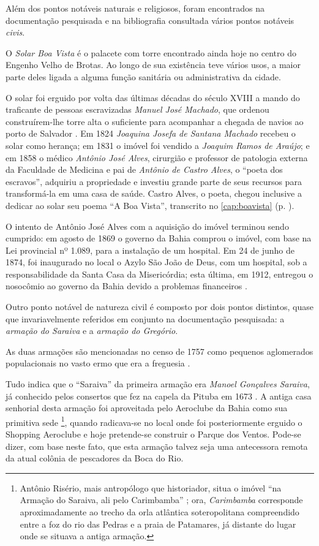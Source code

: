 Além dos pontos notáveis naturais e religiosos, foram encontrados na documentação pesquisada e na bibliografia consultada vários pontos notáveis \textit{civis}.

O \textit{Solar Boa Vista} é o palacete com torre encontrado ainda hoje no centro do Engenho Velho de Brotas. Ao longo de sua existência teve vários usos, a maior parte deles ligada a alguma função sanitária ou administrativa da cidade.

O solar foi erguido por volta das últimas décadas do século XVIII a mando do traficante de pessoas escravizadas \textit{Manuel José Machado}, que ordenou construírem-lhe torre alta o suficiente para acompanhar a chegada de navios ao porto de Salvador \cite[p.~127]{mattos_panorama_2011}. Em 1824 \textit{Joaquina Josefa de Santana Machado} recebeu o solar como herança; em 1831 o imóvel foi vendido a \textit{Joaquim Ramos de Araújo}; e em 1858 o médico \textit{Antônio José Alves}, cirurgião e professor de patologia externa da Faculdade de Medicina e pai de \textit{Antônio de Castro Alves}, o ``poeta dos escravos'', adquiriu a propriedade e investiu grande parte de seus recursos para transformá-la em uma casa de saúde. Castro Alves, o poeta, chegou inclusive a dedicar ao solar seu poema ``A Boa Vista'', transcrito no \autoref{cap:boavista} (p. \pageref{cap:boavista}).

O intento de Antônio José Alves com a aquisição do imóvel terminou sendo cumprido: em agosto de 1869 o governo da Bahia comprou o imóvel, com base na Lei provincial nº 1.089, para a instalação de um hospital. Em 24 de junho de 1874, foi inaugurado no local o Azylo São João de Deus, com um hospital, sob a responsabilidade da Santa Casa da Misericórdia; esta última, em 1912, entregou o nosocômio ao governo da Bahia devido a problemas financeiros \cite{jacobina_asylo_2001}.

Outro ponto notável de natureza civil é composto por dois pontos distintos, quase que invariavelmente referidos em conjunto na documentação pesquisada: a \textit{armação do Saraiva} e a \textit{armação do Gregório}.

As duas armações são mencionadas no censo de 1757 como pequenos aglomerados populacionais no vasto ermo que era a freguesia \cite[p.~183]{castralmeida_ultramar_1908}.

Tudo indica que o ``Saraiva'' da primeira armação era \textit{Manoel Gonçalves Saraiva}, já conhecido pelos consertos que fez na capela da Pituba em 1673 \cite[p.~11]{ott_engenhos_1996}. A antiga casa senhorial desta armação foi aproveitada pelo Aeroclube da Bahia como sua primitiva sede \cite[p.~III-11, verso]{teixeira_doacoes_1978}\footnote{Antônio Risério, mais antropólogo que historiador, situa o imóvel ``na Armação do Saraiva, ali pelo Carimbamba'' \cite{riserio_histba_2004}; ora, \textit{Carimbamba} corresponde aproximadamente ao trecho da orla atlântica soteropolitana compreendido entre a foz do rio das Pedras e a praia de Patamares, já distante do lugar onde se situava a antiga armação.}, quando radicava-se no local onde foi posteriormente erguido o Shopping Aeroclube e hoje pretende-se construir o Parque dos Ventos. Pode-se dizer, com base neste fato, que esta armação talvez seja uma antecessora remota da atual colônia de pescadores da Boca do Rio.

